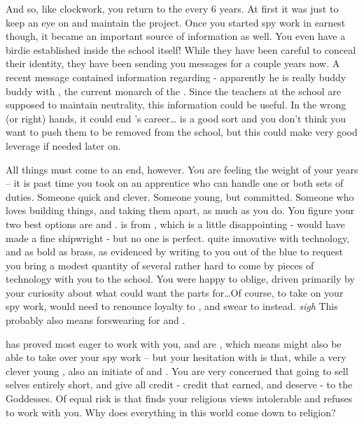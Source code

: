 \documentclass[char]{GL2020}
\begin{document}
And so, like clockwork, you return to the \pSchool{} every 6 years. At first it was just to keep an eye on and maintain the project. Once you started spy work in earnest though, it became an important source of information as well.  You even have a birdie established inside the school itself!  While they have been careful to conceal their identity, they have been sending you messages for a couple years now.  A recent message contained information regarding \cHistory{} - apparently he is really buddy buddy with \cQueen{}, the current monarch of the \pFarm{}.  Since the teachers at the school are supposed to maintain neutrality, this information could be useful.  In the wrong (or right) hands, it could end \cHistory{}’s career\ldots  \cHistory{} is a good sort and you don’t think you want to push them to be removed from the school, but this could make very good leverage if needed later on.

All things must come to an end, however. You are feeling the weight of your years -- it is past time you took on an apprentice who can handle one or both sets of duties. Someone quick and clever. Someone young, but committed. Someone who loves building things, and taking them apart, as much as you do. You figure your two best options are \cTechStar{} and \cInitiate{}. \cTechStar{} is from \pTech{}, which is a little disappointing - \cTechStar{\they} would have made a fine shipwright - but no one is perfect. \cTechStar{\They} \cTechStar{\are} quite innovative with technology, and as bold as brass, as evidenced by \cTechStar{\their} writing to you out of the blue to request you bring a modest quantity of several rather hard to come by pieces of technology with you to the school. You were happy to oblige, driven primarily by your curiosity about what \cTechStar{\they} could want the parts for\ldots Of course, to take on your spy work, \cTechStar{} would need to renounce loyalty to \pTech{}, and swear to \pShip{} instead. \emph{sigh} This probably also means forswearing \cTechGod{} for \cEbb{} and \cFlow{}.

\cInitiate{\full} has proved most eager to work with you, and \cInitiate{\they} are \pShip{}, which means \cInitiate{\they} might also be able to take over your spy work -- but your hesitation with \cInitiate{} is that, while \cInitiate{\they} \cInitiate{\are} a very clever young \cInitiate{\person}, \cInitiate{\they} \cInitiate{\are} also an initiate of \cEbb{} and \cFlow{}. You are very concerned that \cInitiate{\they} \cInitiate{\are} going to sell \cInitiate{\them}selves entirely short, and give all credit - credit that \cInitiate{\they} earned, and \cInitiate{\they} deserve - to the Goddesses. Of equal risk is that \cInitiate{} finds your religious views intolerable and refuses to work with you. Why does everything in this world come down to religion?
\end{document}
